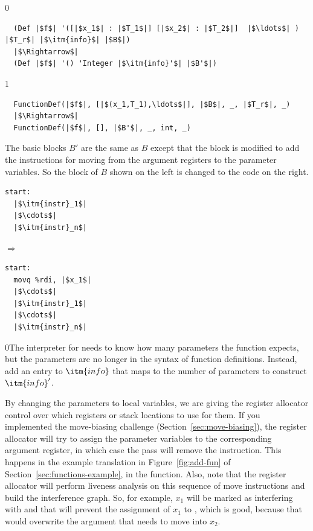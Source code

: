 \documentclass[7x10,nocrop]{TimesAPriori_MIT}%
\def\racketEd{0}
\def\pythonEd{1}
\def\edition{0}
\newcommand{\racket}[1]{{\if\edition\racketEd{#1}\fi}}
\begin{document}
{\if\edition\racketEd
\begin{lstlisting}
  (Def |$f$| '([|$x_1$| : |$T_1$|] [|$x_2$| : |$T_2$|]  |$\ldots$| ) |$T_r$| |$\itm{info}$| |$B$|)
  |$\Rightarrow$|
  (Def |$f$| '() 'Integer |$\itm{info}'$| |$B'$|)
\end{lstlisting}
\fi}
{\if\edition\pythonEd
\begin{lstlisting}
  FunctionDef(|$f$|, [|$(x_1,T_1),\ldots$|], |$B$|, _, |$T_r$|, _)
  |$\Rightarrow$|
  FunctionDef(|$f$|, [], |$B'$|, _, int, _)
\end{lstlisting}
\fi}
The basic blocks $B'$ are the same as $B$ except that the
 block is modified to add the instructions for moving from
the argument registers to the parameter variables. So the 
block of $B$ shown on the left is changed to the code on the right.
\begin{center}
\begin{minipage}{0.3\textwidth}
\begin{lstlisting}
start:
  |$\itm{instr}_1$|
  |$\cdots$|
  |$\itm{instr}_n$|
\end{lstlisting}
\end{minipage}
$\Rightarrow$
\begin{minipage}{0.3\textwidth}
\begin{lstlisting}
start:
  movq %rdi, |$x_1$|
  |$\cdots$|
  |$\itm{instr}_1$|
  |$\cdots$|
  |$\itm{instr}_n$|
\end{lstlisting}
\end{minipage}
\end{center}

\racket{The interpreter for \LangXIndCall{} needs to know how many
  parameters the function expects, but the parameters are no longer in
  the syntax of function definitions. Instead, add an entry to
  $\itm{info}$ that maps \code{num-params} to the number of parameters
  to construct $\itm{info}'$.}

By changing the parameters to local variables, we are giving the
register allocator control over which registers or stack locations to
use for them. If you implemented the move-biasing challenge
(Section~\ref{sec:move-biasing}), the register allocator will try to
assign the parameter variables to the corresponding argument register,
in which case the  pass will remove the
 instruction. This happens in the example translation in
Figure~\ref{fig:add-fun} of Section~\ref{sec:functions-example}, in
the  function.
%
Also, note that the register allocator will perform liveness analysis
on this sequence of move instructions and build the interference
graph. So, for example, $x_1$ will be marked as interfering with
 and that will prevent the assignment of $x_1$ to
, which is good, because that would overwrite the argument
that needs to move into $x_2$.
\end{document}
